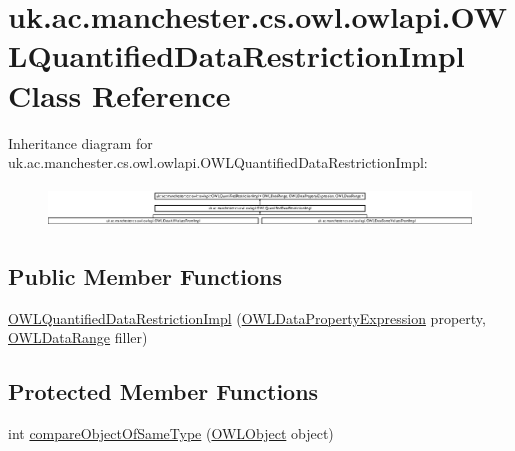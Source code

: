 \hypertarget{classuk_1_1ac_1_1manchester_1_1cs_1_1owl_1_1owlapi_1_1_o_w_l_quantified_data_restriction_impl}{\section{uk.\-ac.\-manchester.\-cs.\-owl.\-owlapi.\-O\-W\-L\-Quantified\-Data\-Restriction\-Impl Class Reference}
\label{classuk_1_1ac_1_1manchester_1_1cs_1_1owl_1_1owlapi_1_1_o_w_l_quantified_data_restriction_impl}
}
Inheritance diagram for uk.\-ac.\-manchester.\-cs.\-owl.\-owlapi.\-O\-W\-L\-Quantified\-Data\-Restriction\-Impl\-:\begin{figure}[H]
\begin{center}
\leavevmode
\includegraphics[height=1.090909cm]{classuk_1_1ac_1_1manchester_1_1cs_1_1owl_1_1owlapi_1_1_o_w_l_quantified_data_restriction_impl}
\end{center}
\end{figure}
\subsection*{Public Member Functions}
\begin{DoxyCompactItemize}
\item 
\hyperlink{classuk_1_1ac_1_1manchester_1_1cs_1_1owl_1_1owlapi_1_1_o_w_l_quantified_data_restriction_impl_a674159a580659ec5d44a1234391cf96b}{O\-W\-L\-Quantified\-Data\-Restriction\-Impl} (\hyperlink{interfaceorg_1_1semanticweb_1_1owlapi_1_1model_1_1_o_w_l_data_property_expression}{O\-W\-L\-Data\-Property\-Expression} property, \hyperlink{interfaceorg_1_1semanticweb_1_1owlapi_1_1model_1_1_o_w_l_data_range}{O\-W\-L\-Data\-Range} filler)
\end{DoxyCompactItemize}
\subsection*{Protected Member Functions}
\begin{DoxyCompactItemize}
\item 
int \hyperlink{classuk_1_1ac_1_1manchester_1_1cs_1_1owl_1_1owlapi_1_1_o_w_l_quantified_data_restriction_impl_a64f787fae0384cb357e55095c2227235}{compare\-Object\-Of\-Same\-Type} (\hyperlink{interfaceorg_1_1semanticweb_1_1owlapi_1_1model_1_1_o_w_l_object}{O\-W\-L\-Object} object)
\end{DoxyCompactItemize}
